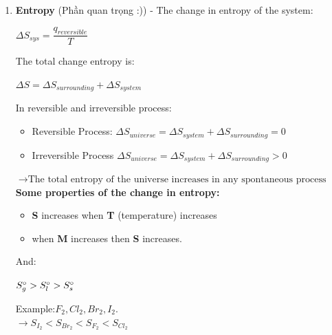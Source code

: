 \documentclass[10pt]{article}
\begin{document}
\begin{enumerate}
	\item \textbf{Entropy} (Phần quan trọng :))
	- The change in entropy of the system:
	\begin{mybox}
	\begin{center}
	$\Delta S_{sys} = \dfrac{q_{reversible}}{T}$
	\end{center}
	\end{mybox}
	The total change entropy is:
	\begin{center}
	$\Delta S = \Delta S_{surrounding} + \Delta S_{system}$
	\end{center}
	In reversible and irreversible process:
	\begin{itemize}
	\item Reversible Process: $\Delta S_{universe} = \Delta S_{system} + \Delta S_{surrounding} = 0$
	\item Irreversible Process $\Delta S_{universe} = \Delta S_{system} + \Delta S_{surrounding} > 0$
	\end{itemize}
	$\rightarrow{\mbox{The total entropy of the universe increases in any spontaneous process}}$\\
	\textbf{Some properties of the change in entropy:}
	\begin{itemize}
	\item \textbf{S} increases when \textbf{T} (temperature) increases
	\item when \textbf{M} increases then \textbf{S} increases.
	\end{itemize}
	And:
	\begin{mybox}
	\begin{center}
	$S_g \degree > S_l \degree > S_s \degree$
	\end{center}
	\end{mybox}
	Example:$F_2, Cl_2, Br_2, I_2$.\\
	$\rightarrow{S_{I_2} < S_{Br_2} < S_{F_2} < S_{Cl_2}}$  
\end{enumerate}
\end{document}
